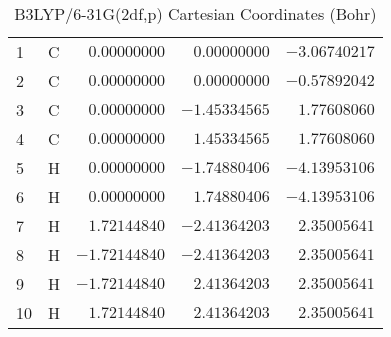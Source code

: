 \documentclass[10pt,oneside]{article}
\begin{document}
\begin{table}[h]
\centering
\caption{B3LYP/6-31G(2df,p) Cartesian Coordinates (Bohr)}
\begin{tabular}{llrrr}
\toprule
1  & C  & $ 0.00000000$ & $ 0.00000000$ & $-3.06740217$ \\
2  & C  & $ 0.00000000$ & $ 0.00000000$ & $-0.57892042$ \\
3  & C  & $ 0.00000000$ & $-1.45334565$ & $ 1.77608060$ \\
4  & C  & $ 0.00000000$ & $ 1.45334565$ & $ 1.77608060$ \\
5  & H  & $ 0.00000000$ & $-1.74880406$ & $-4.13953106$ \\
6  & H  & $ 0.00000000$ & $ 1.74880406$ & $-4.13953106$ \\
7  & H  & $ 1.72144840$ & $-2.41364203$ & $ 2.35005641$ \\
8  & H  & $-1.72144840$ & $-2.41364203$ & $ 2.35005641$ \\
9  & H  & $-1.72144840$ & $ 2.41364203$ & $ 2.35005641$ \\
10 & H  & $ 1.72144840$ & $ 2.41364203$ & $ 2.35005641$ \\
\bottomrule
\end{tabular}
\end{table}
\end{document}
